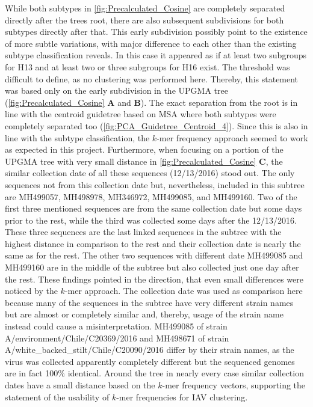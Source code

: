 While both subtypes in \autoref{fig:Precalculated_Cosine} are completely separated directly after the trees root, there are also subsequent subdivisions for both subtypes directly after that. This early subdivision possibly point to the existence of more subtle variations, with major difference to each other than the existing subtype classification reveals. In this case it appeared as if at least two subgroups for H13 and at least two or three subgroups for H16 exist. The threshold was difficult to define, as no clustering was performed here. Thereby, this statement was based only on the early subdivision in the \gls{UPGMA} tree (\autoref{fig:Precalculated_Cosine} \textbf{\textsf{A}} and \textbf{\textsf{B}}). The exact separation from the root is in line with the centroid guidetree based on \gls{MSA} where both subtypes were completely separated too (\autoref{fig:PCA_Guidetree_Centroid_4}). Since this is also in line with the subtype classification, the $k$-mer frequency approach seemed to work as expected in this project. Furthermore, when focusing on a portion of the \gls{UPGMA} tree with very small distance in \autoref{fig:Precalculated_Cosine} \textbf{\textsf{C}}, the similar collection date of all these sequences (12/13/2016) stood out. The only sequences not from this collection date but, nevertheless, included in this subtree are MH499057, MH498978, MH346972, MH499085, and MH499160. Two of the first three mentioned sequences are from the same collection date but some days prior to the rest, while the third was collected some days after the 12/13/2016. These three sequences are the last linked sequences in the subtree with the highest distance in comparison to the rest and their collection date is nearly the same as for the rest. The other two sequences with different date MH499085 and MH499160 are in the middle of the subtree but also collected just one day after the rest. These findings pointed in the direction, that even small differences were noticed by the $k$-mer approach. The collection date was used as comparison here because many of the sequences in the subtree have very different strain names but are almost or completely similar and, thereby, usage of the strain name instead could cause a misinterpretation. MH499085 of strain A/environment/Chile/C20369/2016 and MH498671 of strain A/white\_backed\_stilt/Chile/C20090/2016 differ by their strain names, as the virus was collected apparently completely different but the sequenced genomes are in fact 100\% identical. Around the tree in nearly every case similar collection dates have a small distance based on the $k$-mer frequency vectors, supporting the statement of the usability of $k$-mer frequencies for \gls{IAV} clustering. %

